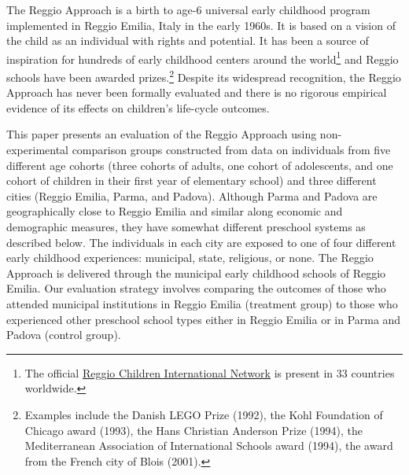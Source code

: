 The Reggio Approach is a birth to age-6 universal early childhood program implemented in Reggio Emilia, Italy in the early 1960s. It is based on a vision of the child as an individual with rights and potential. It has been a source of inspiration for hundreds of early childhood centers around the world\footnote{The official \href{http://www.reggiochildren.it/network/?lang=en}{Reggio Children International Network} is present in 33 countries worldwide.} and Reggio schools have been awarded prizes.\footnote{Examples include the Danish LEGO Prize (1992), the Kohl Foundation of Chicago award (1993), the Hans Christian Anderson Prize (1994), the Mediterranean Association of International Schools award (1994), the award from the French city of Blois (2001).} Despite its widespread recognition, the Reggio Approach has never been formally evaluated and there is no rigorous empirical evidence of its effects on children's life-cycle outcomes.

This paper presents an evaluation of the Reggio Approach using non-experimental comparison groups constructed from data on individuals from five different age cohorts (three cohorts of adults, one cohort of adolescents, and one cohort of children in their first year of elementary school) and three different cities (Reggio Emilia, Parma, and Padova). Although Parma and Padova are geographically close to Reggio Emilia and similar along economic and demographic measures, they have somewhat different preschool systems as described below. The individuals in each city are exposed to one of four different early childhood experiences: municipal, state, religious, or none. The Reggio Approach is delivered through the municipal early childhood schools of Reggio Emilia. Our evaluation strategy involves comparing the outcomes of those who attended municipal institutions in Reggio Emilia (treatment group) to those who experienced other preschool school types either in Reggio Emilia or in Parma and Padova (control group).

